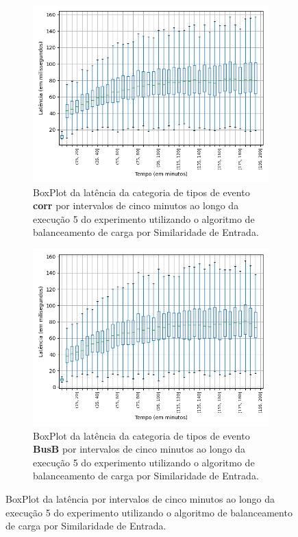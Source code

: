 \begin{figure}
\begin{subfigure}{.5\textwidth}
\centering
\includegraphics[width=\textwidth]{figuras/graphics/boxplot_10-dez-is_corr.png}
\caption{BoxPlot da latência da categoria de tipos de evento \textbf{corr} por intervalos de cinco minutos ao longo da execução 5 do experimento utilizando o algoritmo de balanceamento de carga por Similaridade de Entrada.}
\label{fig:BoxPlot_corr_IS_10-dez-is}
\end{subfigure}%
\begin{subfigure}{.5\textwidth}
\centering
\includegraphics[width=\textwidth]{figuras/graphics/boxplot_10-dez-is_busb.png}
\caption{BoxPlot da latência da categoria de tipos de evento \textbf{BusB} por intervalos de cinco minutos ao longo da execução 5 do experimento utilizando o algoritmo de balanceamento de carga por Similaridade de Entrada.}
\label{fig:BoxPlot_BusB_IS_10-dez-is}
\end{subfigure}%
\caption{BoxPlot da latência por intervalos de cinco minutos ao longo da execução 5 do experimento utilizando o algoritmo de balanceamento de carga por Similaridade de Entrada.}
\end{figure}




